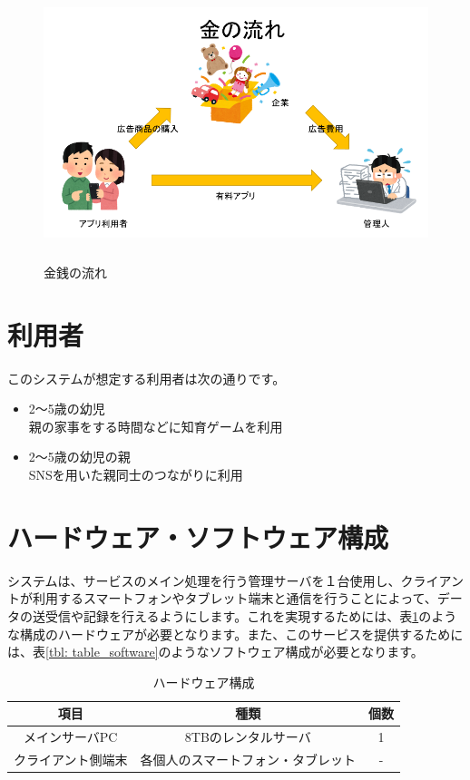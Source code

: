 \documentclass[a4j]{jarticle}
\begin{document}
\begin{figure}[H]
  \begin{center}
    \includegraphics[width = 14cm, height = 8cm]{section5_money.png}
    \caption{金銭の流れ}
    \label{money}
  \end{center}
\end{figure}

\section{利用者}
このシステムが想定する利用者は次の通りです。

\begin{itemize}
\item 2～5歳の幼児\\
  親の家事をする時間などに知育ゲームを利用
\item 2～5歳の幼児の親\\
  SNSを用いた親同士のつながりに利用
\end{itemize}

\section{ハードウェア・ソフトウェア構成}
システムは、サービスのメイン処理を行う管理サーバを１台使用し、クライアントが利用するスマートフォンやタブレット端末と通信を行うことによって、データの送受信や記録を行えるようにします。これを実現するためには、表\ref{tbl: table_hardware}のような構成のハードウェアが必要となります。また、このサービスを提供するためには、表\ref{tbl: table_software}のようなソフトウェア構成が必要となります。

\begin{table}[H]
    \caption{ハードウェア構成}
    \label{tbl: table_hardware}
    \begin{center}
        \begin{tabular}{|c|c|c|} \hline
            項目 & 種類　&  個数\\ \hline
            メインサーバPC & 8TBのレンタルサーバ & 1\\ \hline
            クライアント側端末 & 各個人のスマートフォン・タブレット  & - \\ \hline
        \end{tabular}
    \end{center}
\end{table}
\end{document}
